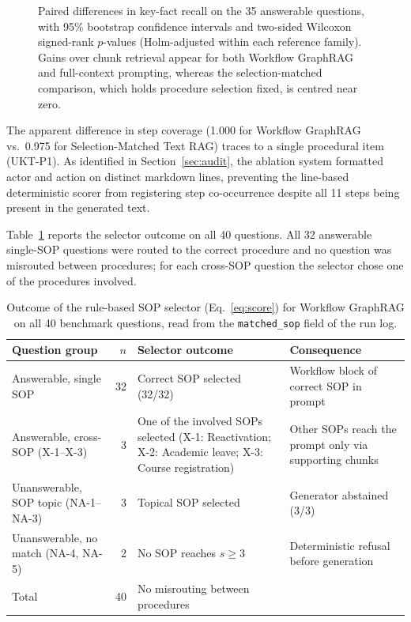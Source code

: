 \documentclass[preprint,10pt]{elsarticle}
\begin{document}
\begin{figure}[!htbp]
\caption{Paired differences in key-fact recall on the 35 answerable questions, with 95\% bootstrap confidence intervals and two-sided Wilcoxon signed-rank $p$-values (Holm-adjusted within each reference family). Gains over chunk retrieval appear for both Workflow GraphRAG and full-context prompting, whereas the selection-matched comparison, which holds procedure selection fixed, is centred near zero.}
\label{fig:forest}
\end{figure}

The apparent difference in step coverage (1.000 for Workflow GraphRAG vs.\ 0.975 for Selection-Matched Text RAG) traces to a single procedural item (UKT-P1). As identified in Section~\ref{sec:audit}, the ablation system formatted actor and action on distinct markdown lines, preventing the line-based deterministic scorer from registering step co-occurrence despite all 11 steps being present in the generated text.

Table~\ref{tab:selection} reports the selector outcome on all 40 questions. All 32 answerable single-SOP questions were routed to the correct procedure and no question was misrouted between procedures; for each cross-SOP question the selector chose one of the procedures involved.

\begin{table}[!htbp]
\centering
\caption{Outcome of the rule-based SOP selector (Eq.~\eqref{eq:score}) for Workflow GraphRAG on all 40 benchmark questions, read from the \texttt{matched\_sop} field of the run log.}
\label{tab:selection}
\small
\setlength{\tabcolsep}{4pt}
\begin{tabularx}{\textwidth}{>{\raggedright\arraybackslash}p{2.7cm} r >{\raggedright\arraybackslash}X >{\raggedright\arraybackslash}p{3.0cm}}
\toprule
Question group & $n$ & Selector outcome & Consequence \\
\midrule
Answerable, single SOP & 32 & Correct SOP selected (32/32) & Workflow block of correct SOP in prompt \\
Answerable, cross-SOP (X-1--X-3) & 3 & One of the involved SOPs selected (X-1: Reactivation; X-2: Academic leave; X-3: Course registration) & Other SOPs reach the prompt only via supporting chunks \\
Unanswerable, SOP topic (NA-1--NA-3) & 3 & Topical SOP selected & Generator abstained (3/3) \\
Unanswerable, no match (NA-4, NA-5) & 2 & No SOP reaches $s \geq 3$ & Deterministic refusal before generation \\
\midrule
Total & 40 & No misrouting between procedures & \\
\bottomrule
\end{tabularx}
\end{table}
\end{document}
